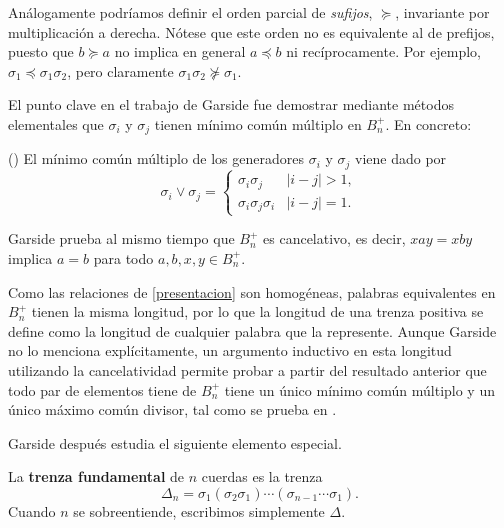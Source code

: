 \documentclass[bibtex, anon]{TEMat-article}
\begin{document}
\begin{nota}
	Análogamente podríamos definir el orden parcial de \emph{sufijos}, $\succcurlyeq$, invariante por multiplicación a derecha. Nótese que este orden no es equivalente al de prefijos, puesto que $b\succcurlyeq a$ no implica en general $a\preccurlyeq b$ ni recíprocamente. Por ejemplo, $\sigma_1\preccurlyeq \sigma_1\sigma_2$, pero claramente $\sigma_1\sigma_2\not\succcurlyeq \sigma_1$.
\end{nota}

El punto clave en el trabajo de Garside fue demostrar mediante métodos elementales que $\sigma_i$ y $\sigma_j$ tienen mínimo común múltiplo en $B_n^+$. En concreto:
\begin{proposicion}(\cite[Teorema 1.2]{Garside})
	El mínimo común múltiplo de los generadores $\sigma_i$ y $\sigma_j$ viene dado por
	$$\sigma_i\lor\sigma_j=\begin{cases}
	\sigma_i\sigma_j & |i-j|>1,\\
	\sigma_i\sigma_j\sigma_i & |i-j|=1.
	\end{cases}$$
\end{proposicion}

Garside prueba al mismo tiempo que $B_n^+$ es cancelativo, es decir, $xay=xby$ implica $a=b$ para todo $a,b,x,y\in B_n^+$.

Como las relaciones de \ref{presentacion} son homogéneas, palabras equivalentes en $B_n^+$ tienen la misma longitud, por lo que la longitud de una trenza positiva se define como la longitud de cualquier palabra que la represente. Aunque Garside no lo menciona explícitamente, un argumento inductivo en esta longitud utilizando la cancelatividad permite probar a partir del resultado anterior que todo par de elementos tiene de $B_n^+$ tiene un único mínimo común múltiplo y un único máximo común divisor, tal como se prueba en \cite{Dehornoy}. 

Garside después estudia el siguiente elemento especial.
\begin{definicion}
	La \textbf{trenza fundamental} de $n$ cuerdas es la trenza
	$$\Delta_n=\sigma_1(\sigma_2\sigma_1)\cdots(\sigma_{n-1}\cdots\sigma_1).$$
	Cuando $n$ se sobreentiende, escribimos simplemente $\Delta$. 
\end{definicion} 
\end{document}
